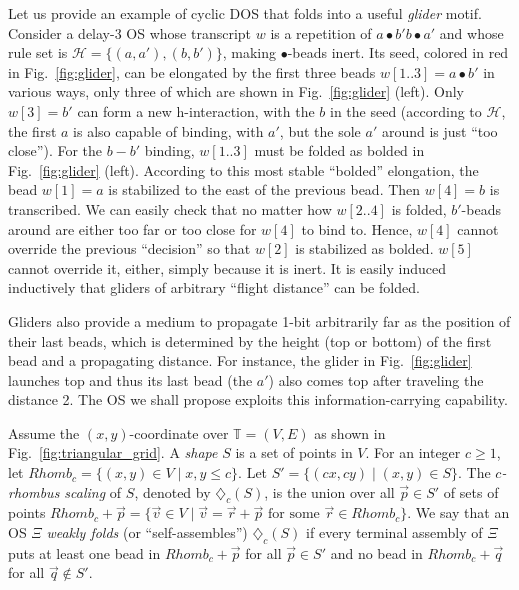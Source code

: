 \documentclass[runningheads]{llncs}
\begin{document}


Let us provide an example of cyclic DOS that folds into a useful \textit{glider} motif. 
Consider a delay-3 OS whose transcript $w$ is a repetition of $a \bullet b' b \bullet a'$ and whose rule set is $\mathcal{H} = \{(a, a'), (b, b')\}$, making $\bullet$-beads inert. 
Its seed, colored in red in Fig.~\ref{fig:glider}, can be elongated by the first three beads $w[1..3] = a \bullet b'$ in various ways, only three of which are shown in Fig.~\ref{fig:glider} (left). 
Only $w[3] = b'$ can form a new h-interaction, with the $b$ in the seed (according to $\mathcal{H}$, the first $a$ is also capable of binding, with $a'$, but the sole $a'$ around is just ``too close''). 
For the $b{-}b'$ binding, $w[1..3]$ must be folded as bolded in Fig.~\ref{fig:glider} (left). 
According to this most stable ``bolded'' elongation, the bead $w[1] = a$ is stabilized to the east of the previous bead. 
Then $w[4] = b$ is transcribed. 
We can easily check that no matter how $w[2..4]$ is folded, $b'$-beads around are either too far or too close for $w[4]$ to bind to. 
Hence, $w[4]$ cannot override the previous ``decision'' so that $w[2]$ is stabilized as bolded. 
$w[5]$ cannot override it, either, simply because it is inert. 
It is easily induced inductively that gliders of arbitrary ``flight distance'' can be folded. 

Gliders also provide a medium to propagate 1-bit arbitrarily far as the position of their last beads, which is determined by the height (top or bottom) of the first bead and a propagating distance.  
For instance, the glider in Fig.~\ref{fig:glider} launches top and thus its last bead (the $a'$) also comes top after traveling the distance 2.
The OS we shall propose exploits this information-carrying capability.

Assume the $(x, y)$-coordinate over $\mathbb{T} = (V, E)$ as shown in Fig.~\ref{fig:triangular_grid}. 
A \textit{shape} $S$ is a set of points in $V$. 
For an integer $c \ge 1$, let $Rhomb_c = \{(x, y) \in V \mid x, y \le c\}$.
Let $S' = \{(cx, cy) \mid (x, y) \in S\}$. 
The \textit{$c$-rhombus scaling} of $S$, denoted by $\diamondsuit_c(S)$, is the union over all $\vec{p} \in S'$ of sets of points $Rhomb_c + \vec{p} = \{\vec{v} \in V \mid \mbox{$\vec{v} = \vec{r} + \vec{p}$ for some $\vec{r} \in Rhomb_c$}\}$.
We say that an OS $\Xi$ \textit{weakly folds} (or ``self-assembles'') $\diamondsuit_c(S)$ if every terminal assembly of $\Xi$ puts at least one bead in $Rhomb_c + \vec{p}$ for all $\vec{p} \in S'$ and no bead in $Rhomb_c + \vec{q}$ for all $\vec{q} \not\in S'$. 
\end{document}
